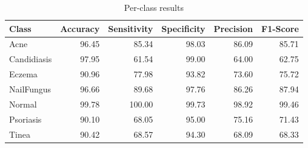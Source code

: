 \begin{table}
\caption{Per-class results}
\label{tab:results}
\begin{tabular}{lrrrrr}
\toprule
Class & Accuracy & Sensitivity & Specificity & Precision & F1-Score \\
\midrule
Acne & 96.45 & 85.34 & 98.03 & 86.09 & 85.71 \\
Candidiasis & 97.95 & 61.54 & 99.00 & 64.00 & 62.75 \\
Eczema & 90.96 & 77.98 & 93.82 & 73.60 & 75.72 \\
NailFungus & 96.66 & 89.68 & 97.76 & 86.26 & 87.94 \\
Normal & 99.78 & 100.00 & 99.73 & 98.92 & 99.46 \\
Psoriasis & 90.10 & 68.05 & 95.00 & 75.16 & 71.43 \\
Tinea & 90.42 & 68.57 & 94.30 & 68.09 & 68.33 \\
\bottomrule
\end{tabular}
\end{table}
